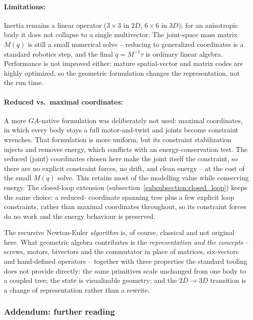 \paragraph{Limitations:} Inertia remains a linear operator ($3\times3$ in $2D$, $6\times6$
in $3D$); for an
anisotropic body it does not collapse to a single multivector. The joint-space mass matrix
$M(q)$ is still a small numerical solve -- reducing to generalized coordinates is a
standard robotics step, and the final $\ddot{q} = M^{-1}\tau$ is ordinary linear algebra.
Performance is not improved either: mature spatial-vector and matrix codes are highly
optimized, so the geometric formulation changes the representation, not the run
time.

\paragraph{Reduced vs.\ maximal coordinates:} A more $GA$-native formulation was
deliberately not used: maximal
coordinates, in which every body stays a full motor-and-twist and joints become constraint
wrenches. That formulation is more uniform, but its constraint stabilization
injects and removes energy, which conflicts with an energy-conservation test. The reduced
(joint) coordinates chosen here make the joint itself the constraint, so there are no
explicit constraint forces, no drift, and clean energy -- at the cost of the small $M(q)$
solve. This retains most of the modelling value while conserving energy. The closed-loop
extension (subsection~\ref{subsubsection:closed_loop}) keeps the same choice: a reduced-
coordinate spanning tree plus a few explicit loop constraints, rather than maximal
coordinates throughout, so its constraint forces do no work and the energy behaviour is
preserved.

The recursive Newton-Euler \emph{algorithm} is, of course, classical and not original
here. What geometric algebra contributes is the \emph{representation and the concepts} --
screws, motors, bivectors and the commutator in place of matrices, six-vectors and
hand-defined operators -- together with three properties the standard tooling does not
provide directly: the same primitives scale unchanged from one body to a coupled tree; the
state is visualizable geometry; and the $2D \to 3D$ transition is a change of
representation rather than a rewrite.


\subsubsection{Addendum: further reading}
\label{subsubsection:addendum_further_reading}

